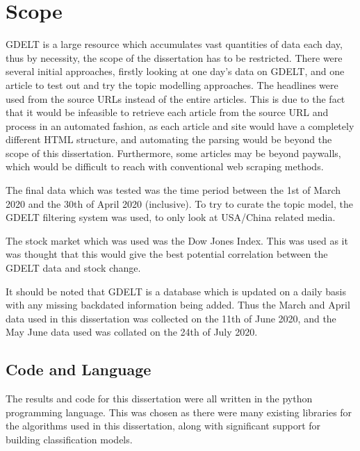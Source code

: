 \section{Scope}
\label{scope}
GDELT is a large resource which accumulates vast quantities of data each day, thus by necessity, the scope of the dissertation has to be restricted. There were several initial approaches, firstly looking at one day's data on GDELT, and one article to test out and try the topic modelling approaches. The headlines were used from the source URLs instead of the entire articles. This is due to the fact that it would be infeasible to retrieve each article from the source URL and process in an automated fashion, as each article and site would have a completely different HTML structure, and automating the parsing would be beyond the scope of this dissertation. Furthermore, some articles may be beyond paywalls, which would be difficult to reach with conventional web scraping methods.

The final data which was tested was the time period between the 1st of March 2020 and the 30th of April 2020 (inclusive). To try to curate the topic model, the GDELT filtering system was used, to only look at USA/China related media. 

The stock market which was used was the Dow Jones Index. This was used as it was thought that this would give the best potential correlation between the GDELT data and stock change. 

It should be noted that GDELT is a database which is updated on a daily basis with any missing backdated information being added. Thus the March and April data used in this dissertation was collected on the 11th of June 2020, and the May June data used was collated on the 24th of July 2020. 

\subsection{Code and Language}
The results and code for this dissertation were all written in the python programming language. This was chosen as there were many existing libraries for the algorithms used in this dissertation, along with significant support for building classification models. 

